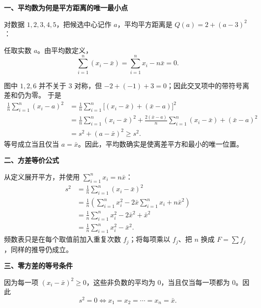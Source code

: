 \clearpage
\begin{proofbox}

	\textbf{\textcolor{CProof}{一、平均数为何是平方距离的唯一最小点}}

	对数据 $1,2,3,4,5$，把候选中心记作 $a$，平均平方距离是
	$Q(a)=2+(a-3)^2$：

	

	任取实数 $a$。由平均数定义，
	\[
		\sum_{i=1}^{n}(x_i-\bar x)
		=\sum_{i=1}^{n}x_i-n\bar x=0.
	\]
	
	图中 $1,2,6$ 并不关于 $3$ 对称，但 $-2+(-1)+3=0$；因此交叉项中的带符号离差和仍为零。
	于是
	\[
		\begin{aligned}
		\frac1n\sum_{i=1}^{n}(x_i-a)^2
		&=\frac1n\sum_{i=1}^{n}\bigl[(x_i-\bar x)+(\bar x-a)\bigr]^2\\
		&=\frac1n\sum_{i=1}^{n}(x_i-\bar x)^2
		 +\frac{2(\bar x-a)}n\sum_{i=1}^{n}(x_i-\bar x)
		 +(\bar x-a)^2\\
		&=s^2+(a-\bar x)^2\ge s^2.
		\end{aligned}
	\]
	等号成立当且仅当 $a=\bar x$。因此，平均数确实是使离差平方和最小的唯一位置。

	\medskip
	\textbf{\textcolor{CProof}{二、方差等价公式}}

	从定义展开平方，并使用 $\sum_{i=1}^{n}x_i=n\bar x$：
	\[
		\begin{aligned}
		s^2
		&=\frac1n\sum_{i=1}^{n}(x_i-\bar x)^2\\
		&=\frac1n\left(\sum_{i=1}^{n}x_i^2
		-2\bar x\sum_{i=1}^{n}x_i+n\bar x^2\right)\\
		&=\frac1n\sum_{i=1}^{n}x_i^2-2\bar x^2+\bar x^2\\
		&=\frac1n\sum_{i=1}^{n}x_i^2-\bar x^2.
		\end{aligned}
	\]
	频数表只是在每个取值前加入重复次数 $f_j$；将每项乘以 $f_j$、把 $n$ 换成 $F=\sum f_j$，同样的推导仍成立。

	\medskip
	\textbf{\textcolor{CProof}{三、零方差的等号条件}}

	

	因为每一项 $(x_i-\bar x)^2\ge0$，这些非负数的平均为 $0$，当且仅当每一项都为 $0$。因此
	\[
		s^2=0\iff x_1=x_2=\cdots=x_n=\bar x.
	\]

\end{proofbox}
